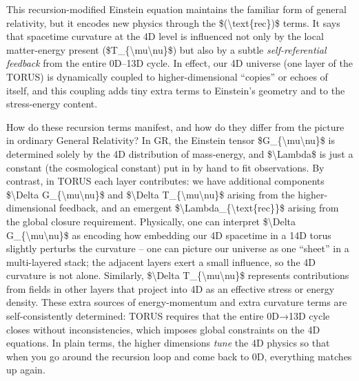 \documentclass[
]{article}
\begin{document}
This recursion-modified Einstein equation maintains the familiar form of
general relativity, but it encodes new physics through the
\$(\textbackslash text\{rec\})\$ terms. It says that spacetime curvature
at the 4D level is influenced not only by the local matter-energy
present (\$T\_\{\textbackslash mu\textbackslash nu\}\$) but also by a
subtle \emph{self-referential feedback} from the entire 0D--13D cycle.
In effect, our 4D universe (one layer of the TORUS) is dynamically
coupled to higher-dimensional ``copies'' or echoes of itself, and this
coupling adds tiny extra terms to Einstein's geometry and to the
stress-energy content.

How do these recursion terms manifest, and how do they differ from the
picture in ordinary General Relativity? In GR, the Einstein tensor
\$G\_\{\textbackslash mu\textbackslash nu\}\$ is determined solely by
the 4D distribution of mass-energy, and \$\textbackslash Lambda\$ is
just a constant (the cosmological constant) put in by hand to fit
observations. By contrast, in TORUS each layer contributes: we have
additional components \$\textbackslash Delta
G\_\{\textbackslash mu\textbackslash nu\}\$ and \$\textbackslash Delta
T\_\{\textbackslash mu\textbackslash nu\}\$ arising from the
higher-dimensional feedback, and an emergent
\$\textbackslash Lambda\_\{\textbackslash text\{rec\}\}\$ arising from
the global closure requirement. Physically, one can interpret
\$\textbackslash Delta G\_\{\textbackslash mu\textbackslash nu\}\$ as
encoding how embedding our 4D spacetime in a 14D torus slightly perturbs
the curvature -- one can picture our universe as one ``sheet'' in a
multi-layered stack; the adjacent layers exert a small influence, so the
4D curvature is not alone. Similarly, \$\textbackslash Delta
T\_\{\textbackslash mu\textbackslash nu\}\$ represents contributions
from fields in other layers that project into 4D as an effective stress
or energy density. These extra sources of energy-momentum and extra
curvature terms are self-consistently determined: TORUS requires that
the entire 0D→13D cycle closes without inconsistencies, which imposes
global constraints on the 4D equations. In plain terms, the higher
dimensions \emph{tune} the 4D physics so that when you go around the
recursion loop and come back to 0D, everything matches up again.
\end{document}
